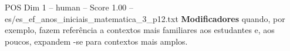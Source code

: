 \begin{textsample}{POS Dim 1 – human – Score 1.00 – es/es\_ef\_anos\_iniciais\_matematica\_3\_p12.txt}  \label{ex:f1_pos_018}
\textbf{Modificadores} quando, por exemplo, fazem referência a contextos mais familiares aos estudantes e, aos poucos, expandem -se para contextos mais amplos.

\end{textsample}
